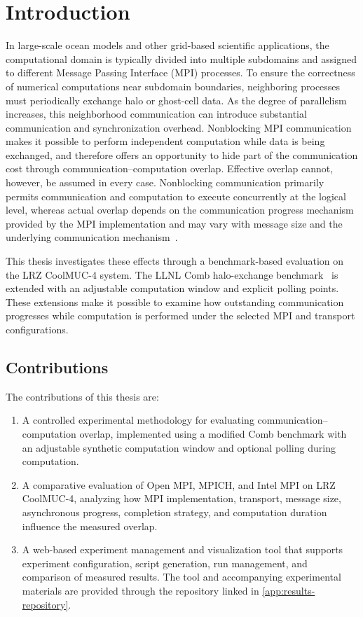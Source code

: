 
\chapter{Introduction}\label{chapter:introduction}

In large-scale ocean models and other grid-based scientific applications, the
computational domain is typically divided into multiple subdomains and assigned
to different Message Passing Interface (MPI) processes. To ensure the correctness
of numerical computations near subdomain boundaries, neighboring processes must
periodically exchange halo or ghost-cell data. As the degree of parallelism
increases, this neighborhood communication can introduce substantial
communication and synchronization overhead. Nonblocking MPI communication makes
it possible to perform independent computation while data is being exchanged,
and therefore offers an opportunity to hide part of the communication cost
through communication--computation overlap. Effective overlap cannot, however,
be assumed in every case. Nonblocking communication primarily permits
communication and computation to execute concurrently at the logical level,
whereas actual overlap depends on the communication progress mechanism provided
by the MPI implementation and may vary with message size and the underlying
communication mechanism~\parencite{denis2016mpi}.

This thesis investigates these effects through a benchmark-based evaluation
on the LRZ CoolMUC-4 system. The LLNL Comb halo-exchange benchmark~\parencite{combGithub} is extended
with an adjustable computation window and explicit polling points. These
extensions make it possible to examine how outstanding communication
progresses while computation is performed under the selected MPI and
transport configurations.

\section{Contributions}
\label{sec:contributions}

The contributions of this thesis are:
\begin{enumerate}
    \item A controlled experimental methodology for evaluating communication--computation overlap, implemented using a modified Comb benchmark with an adjustable synthetic computation window and optional polling during computation.
    \item A comparative evaluation of Open MPI, MPICH, and Intel MPI on LRZ CoolMUC-4, analyzing how MPI implementation, transport, message size, asynchronous progress, completion strategy, and computation duration influence the measured overlap.
    \item A web-based experiment management and visualization tool that supports experiment configuration, script generation, run management, and comparison of measured results. The tool and accompanying experimental
    materials are provided through the repository linked in
    \autoref{app:results-repository}.
\end{enumerate}

